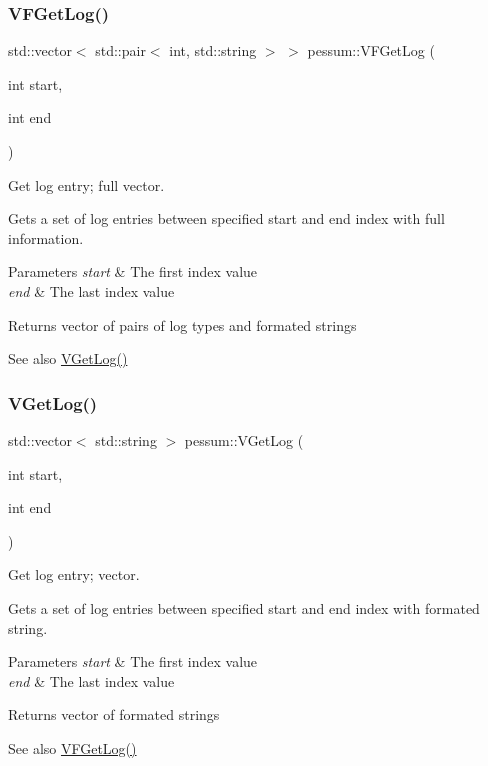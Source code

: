 \subsubsection{\texorpdfstring{V\+F\+Get\+Log()}{VFGetLog()}}
{\footnotesize\ttfamily std\+::vector$<$ std\+::pair$<$ int, std\+::string $>$ $>$ pessum\+::\+V\+F\+Get\+Log (\begin{DoxyParamCaption}\item[{int}]{start,  }\item[{int}]{end }\end{DoxyParamCaption})}



Get log entry; full vector. 

Gets a set of log entries between specified start and end index with full information. 
\begin{DoxyParams}{Parameters}
{\em start} & The first index value \\
\hline
{\em end} & The last index value \\
\hline
\end{DoxyParams}
\begin{DoxyReturn}{Returns}
vector of pairs of log types and formated strings 
\end{DoxyReturn}
\begin{DoxySeeAlso}{See also}
\hyperlink{namespacepessum_a82047101ac6c52e881b2817c487038ff}{V\+Get\+Log()} 
\end{DoxySeeAlso}
\mbox{\label{namespacepessum_a82047101ac6c52e881b2817c487038ff}} 
\subsubsection{\texorpdfstring{V\+Get\+Log()}{VGetLog()}}
{\footnotesize\ttfamily std\+::vector$<$ std\+::string $>$ pessum\+::\+V\+Get\+Log (\begin{DoxyParamCaption}\item[{int}]{start,  }\item[{int}]{end }\end{DoxyParamCaption})}



Get log entry; vector. 

Gets a set of log entries between specified start and end index with formated string. 
\begin{DoxyParams}{Parameters}
{\em start} & The first index value \\
\hline
{\em end} & The last index value \\
\hline
\end{DoxyParams}
\begin{DoxyReturn}{Returns}
vector of formated strings 
\end{DoxyReturn}
\begin{DoxySeeAlso}{See also}
\hyperlink{namespacepessum_a32367e906bdf84c0942a5e4a3588b255}{V\+F\+Get\+Log()} 
\end{DoxySeeAlso}


